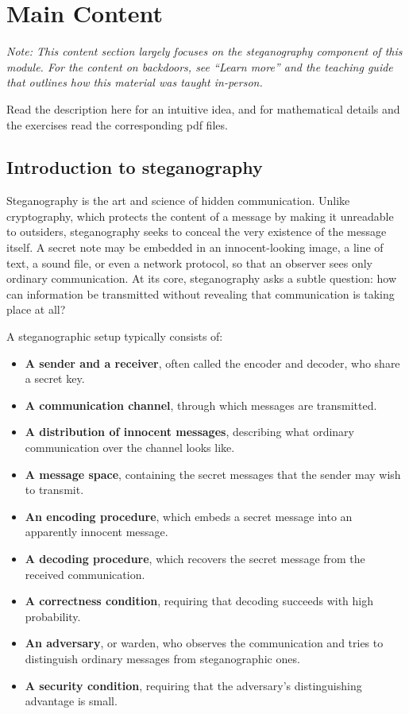 \documentclass[11pt]{article}
\begin{document}
\section{Main Content}
\label{sec:main-content}

\emph{Note: This content section largely focuses on the steganography component
of this module. For the content on backdoors, see ``Learn more'' and the
teaching guide that outlines how this material was taught in-person.}

Read the description here for an intuitive idea, and for mathematical details
and the exercises read the corresponding pdf files.

\subsection{Introduction to steganography}
\label{sec:intro-stego}

Steganography is the art and science of hidden communication. Unlike
cryptography, which protects the content of a message by making it unreadable
to outsiders, steganography seeks to conceal the very existence of the message
itself. A secret note may be embedded in an innocent-looking image, a line of
text, a sound file, or even a network protocol, so that an observer sees only
ordinary communication. At its core, steganography asks a subtle question: how
can information be transmitted without revealing that communication is taking
place at all?

A steganographic setup typically consists of:

\begin{itemize}
  \item \textbf{A sender and a receiver}, often called the encoder and decoder,
        who share a secret key.
  \item \textbf{A communication channel}, through which messages are
        transmitted.
  \item \textbf{A distribution of innocent messages}, describing what ordinary
        communication over the channel looks like.
  \item \textbf{A message space}, containing the secret messages that the sender
        may wish to transmit.
  \item \textbf{An encoding procedure}, which embeds a secret message into an
        apparently innocent message.
  \item \textbf{A decoding procedure}, which recovers the secret message from
        the received communication.
  \item \textbf{A correctness condition}, requiring that decoding succeeds with
        high probability.
  \item \textbf{An adversary}, or warden, who observes the communication and
        tries to distinguish ordinary messages from steganographic ones.
  \item \textbf{A security condition}, requiring that the adversary's
        distinguishing advantage is small.
\end{itemize}
\end{document}
